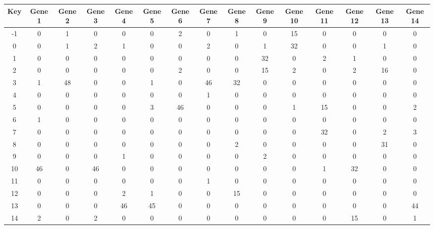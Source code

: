 \begin{tabular}{|c|c|c|c|c|c|c|c|c|c|c|c|c|c|c|}
\hline
Key & Gene 1 & Gene 2 & Gene 3 & Gene 4 & Gene 5 & Gene 6 & Gene 7 & Gene 8 & Gene 9 & Gene 10 & Gene 11 & Gene 12 & Gene 13 & Gene 14 \\
\hline
-1 & 0 & 1 & 0 & 0 & 0 & 2 & 0 & 1 & 0 & 15 & 0 & 0 & 0 & 0 \\
0 & 0 & 1 & 2 & 1 & 0 & 0 & 2 & 0 & 1 & 32 & 0 & 0 & 1 & 0 \\
1 & 0 & 0 & 0 & 0 & 0 & 0 & 0 & 0 & 32 & 0 & 2 & 1 & 0 & 0 \\
2 & 0 & 0 & 0 & 0 & 0 & 2 & 0 & 0 & 15 & 2 & 0 & 2 & 16 & 0 \\
3 & 1 & 48 & 0 & 0 & 1 & 0 & 46 & 32 & 0 & 0 & 0 & 0 & 0 & 0 \\
4 & 0 & 0 & 0 & 0 & 0 & 0 & 1 & 0 & 0 & 0 & 0 & 0 & 0 & 0 \\
5 & 0 & 0 & 0 & 0 & 3 & 46 & 0 & 0 & 0 & 1 & 15 & 0 & 0 & 2 \\
6 & 1 & 0 & 0 & 0 & 0 & 0 & 0 & 0 & 0 & 0 & 0 & 0 & 0 & 0 \\
7 & 0 & 0 & 0 & 0 & 0 & 0 & 0 & 0 & 0 & 0 & 32 & 0 & 2 & 3 \\
8 & 0 & 0 & 0 & 0 & 0 & 0 & 0 & 2 & 0 & 0 & 0 & 0 & 31 & 0 \\
9 & 0 & 0 & 0 & 1 & 0 & 0 & 0 & 0 & 2 & 0 & 0 & 0 & 0 & 0 \\
10 & 46 & 0 & 46 & 0 & 0 & 0 & 0 & 0 & 0 & 0 & 1 & 32 & 0 & 0 \\
11 & 0 & 0 & 0 & 0 & 0 & 0 & 1 & 0 & 0 & 0 & 0 & 0 & 0 & 0 \\
12 & 0 & 0 & 0 & 2 & 1 & 0 & 0 & 15 & 0 & 0 & 0 & 0 & 0 & 0 \\
13 & 0 & 0 & 0 & 46 & 45 & 0 & 0 & 0 & 0 & 0 & 0 & 0 & 0 & 44 \\
14 & 2 & 0 & 2 & 0 & 0 & 0 & 0 & 0 & 0 & 0 & 0 & 15 & 0 & 1 \\
\hline
\end{tabular}